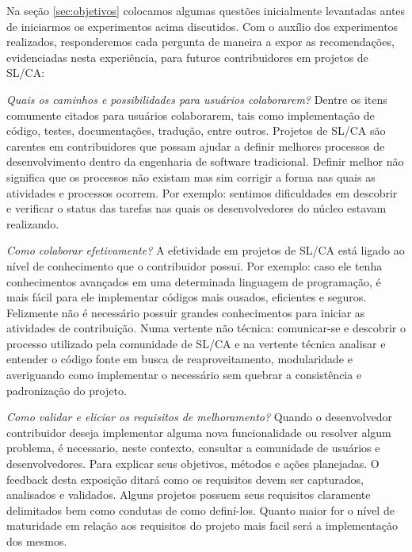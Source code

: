 Na seção \ref{sec:objetivos} colocamos algumas questões inicialmente levantadas antes de iniciarmos os experimentos acima discutidos. Com o auxílio dos experimentos realizados, responderemos cada pergunta de maneira a expor as recomendações, evidenciadas nesta experiência, para futuros contribuidores em projetos de SL/CA:

\textit{Quais os caminhos e possibilidades para usuários colaborarem?} Dentre os itens comumente citados para usuários colaborarem, tais como implementação de código, testes, documentações, tradução, entre outros. Projetos de SL/CA são carentes em contribuidores que possam ajudar a definir melhores processos de desenvolvimento dentro da engenharia de software tradicional. Definir melhor não significa que os processos não existam mas sim corrigir a forma nas quais as atividades e processos ocorrem. Por exemplo: sentimos dificuldades em descobrir e verificar o status das tarefas nas quais os desenvolvedores do núcleo estavam realizando.

\textit{Como colaborar efetivamente?} A efetividade em projetos de SL/CA está ligado ao nível de conhecimento que o contribuidor possui. Por exemplo: caso ele tenha conhecimentos avançados em uma determinada linguagem de programação, é mais fácil para ele implementar códigos mais ousados, eficientes e seguros. Felizmente não é necessário possuir grandes conhecimentos para iniciar as atividades de contribuição. Numa vertente não técnica: comunicar-se e descobrir o processo utilizado pela comunidade de SL/CA e na vertente técnica analisar e entender o código fonte em busca de reaproveitamento, modularidade e averiguando como implementar o necessário sem quebrar a consistência e padronização do projeto.

% 

\textit{Como validar e eliciar os requisitos de melhoramento?} Quando o desenvolvedor contribuidor deseja implementar alguma nova funcionalidade ou resolver algum problema, é necessario, neste contexto, consultar a comunidade de usuários e desenvolvedores. Para explicar seus objetivos, métodos e ações planejadas. O feedback desta exposição ditará como os requisitos devem ser capturados, analisados e validados. Alguns projetos possuem seus requisitos claramente delimitados bem como condutas de como definí-los. Quanto maior for o nível de maturidade em relação aos requisitos do projeto mais facil será a implementação dos mesmos.

